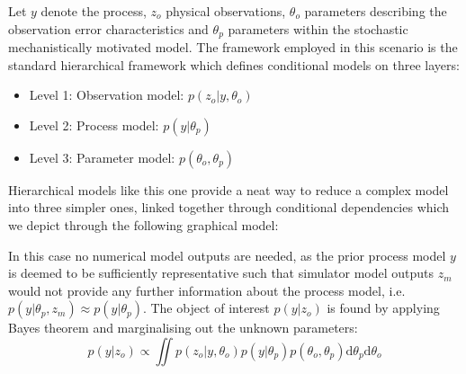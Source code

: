 \documentclass[10pt,a4paper]{article}
\newcommand{\intd} {\textrm{d}}
\begin{document}
Let $y$ denote the process, $z_o$ physical observations, $\theta_o$ parameters describing the observation error characteristics and $\theta_p$ parameters within the stochastic mechanistically motivated model. The framework employed in this scenario is the standard hierarchical framework \citep[e.g.][]{Wikle_2003} which defines conditional models on three layers:
\begin{itemize}
\item Level 1: Observation model: $p(z_o | y, \theta_o)$
\item Level 2: Process model: $p(y | \theta_p)$
\item Level 3: Parameter model: $p(\theta_o, \theta_p)$
\end{itemize}
\noindent Hierarchical models like this one provide a neat way to reduce a complex model into three simpler ones, linked together through conditional dependencies which we depict through the following graphical model:

\begin{figure}[h!]
\centering
{}
\end{figure}

\noindent In this case no numerical model outputs are needed, as the prior process model $y$ is deemed to be sufficiently representative such that simulator model outputs $z_m$ would not provide any further information about the process model, i.e. $p(y | \theta_p,z_m) \approx p(y | \theta_p)$. The object of interest $p(y|z_o)$ is found by applying Bayes theorem and marginalising out the unknown parameters:
\begin{equation}
p(y|z_o) \propto \iint p(z_o | y, \theta_o)p(y | \theta_p)p(\theta_o, \theta_p) \intd \theta_p \intd\theta_o
\end{equation}
\end{document}
